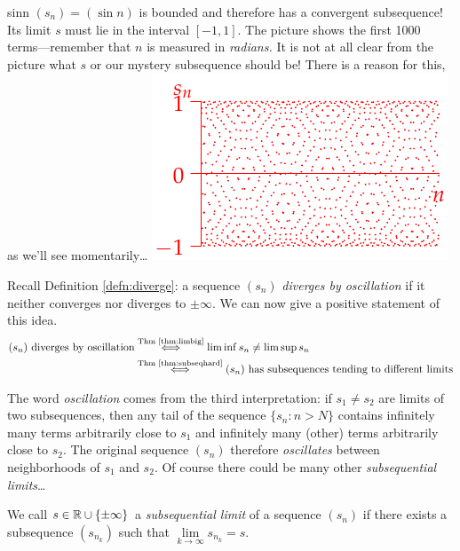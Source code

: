\begin{example}[lower separated=false, sidebyside, sidebyside align=top seam, sidebyside gap=0pt, righthand width=0.35\linewidth]{}{sinn}
	$(s_n)=(\sin n)$ is bounded and therefore has a convergent subsequence! Its limit $s$ must lie in the interval $[-1,1]$.\smallbreak
	The picture shows the first 1000 terms---remember that $n$ is measured in \emph{radians.} It is not at all clear from the picture what $s$ or our mystery subsequence should be! There is a reason for this, as we'll see momentarily\ldots
	\tcblower
	\hfill\includegraphics[scale=0.95]{bwsine}
\end{example}


\goodbreak



Recall Definition \ref{defn:diverge}: a sequence $(s_n)$ \emph{diverges by oscillation} if it neither converges nor diverges to $\pm\infty$. We can now give a positive statement of this idea.
\begin{align*}
	(s_n) \text{ diverges by oscillation}
	&\overset{\text{Thm \ref{thm:limbig}}}{\iff} \liminf s_n\neq \limsup s_n\\
	&\overset{\text{Thm \ref{thm:subseqhard}}}{\iff}(s_n) \text{ has subsequences tending to different limits}
\end{align*}

The word \emph{oscillation} comes from the third interpretation: if $s_1\neq s_2$ are limits of two subsequences, then any tail of the sequence $\{s_n:n>N\}$ contains infinitely many terms arbitrarily close to $s_1$ and infinitely many (other) terms arbitrarily close to $s_2$. The original sequence $(s_n)$ therefore \emph{oscillates} between neighborhoods of $s_1$ and $s_2$. Of course there could be many other \emph{subsequential limits}\ldots


\begin{defn}{}{}
	We call $s\in\mathbb{R}\cup\{\pm\infty\}$ a \emph{subsequential limit} of a sequence $(s_n)$ if there exists a subsequence $(s_{n_k})$ such that $\lim\limits_{k\to\infty}s_{n_k}=s$.
\end{defn}

